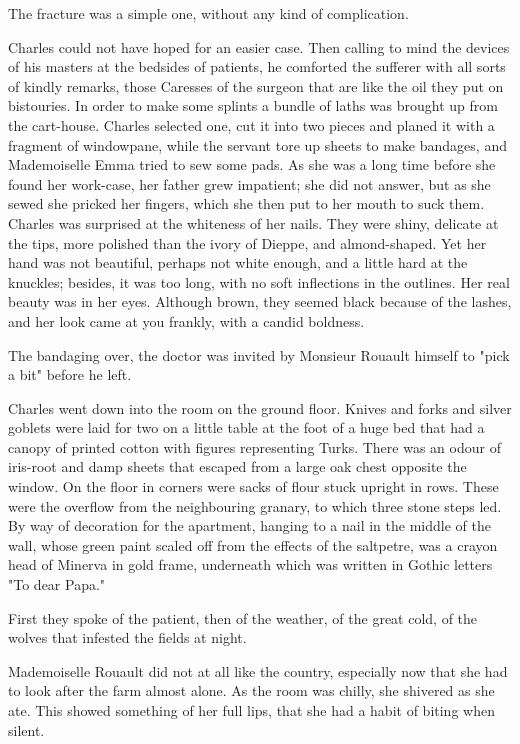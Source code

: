 \documentclass{tufte-book}
\begin{document}
The fracture was a simple one, without any kind of complication.

Charles could not have hoped for an easier case. Then calling to mind
the devices of his masters at the bedsides of patients, he comforted the
sufferer with all sorts of kindly remarks, those Caresses of the surgeon
that are like the oil they put on bistouries. In order to make some
splints a bundle of laths was brought up from the cart-house. Charles
selected one, cut it into two pieces and planed it with a fragment
of windowpane, while the servant tore up sheets to make bandages, and
Mademoiselle Emma tried to sew some pads. As she was a long time before
she found her work-case, her father grew impatient; she did not answer,
but as she sewed she pricked her fingers, which she then put to her
mouth to suck them. Charles was surprised at the whiteness of her nails.
They were shiny, delicate at the tips, more polished than the ivory of
Dieppe, and almond-shaped. Yet her hand was not beautiful, perhaps not
white enough, and a little hard at the knuckles; besides, it was too
long, with no soft inflections in the outlines. Her real beauty was in
her eyes. Although brown, they seemed black because of the lashes, and
her look came at you frankly, with a candid boldness.

The bandaging over, the doctor was invited by Monsieur Rouault himself
to "pick a bit" before he left.

Charles went down into the room on the ground floor. Knives and forks
and silver goblets were laid for two on a little table at the foot of a
huge bed that had a canopy of printed cotton with figures representing
Turks. There was an odour of iris-root and damp sheets that escaped
from a large oak chest opposite the window. On the floor in corners were
sacks of flour stuck upright in rows. These were the overflow from
the neighbouring granary, to which three stone steps led. By way of
decoration for the apartment, hanging to a nail in the middle of the
wall, whose green paint scaled off from the effects of the saltpetre,
was a crayon head of Minerva in gold frame, underneath which was written
in Gothic letters "To dear Papa."

First they spoke of the patient, then of the weather, of the great cold,
of the wolves that infested the fields at night.

Mademoiselle Rouault did not at all like the country, especially now
that she had to look after the farm almost alone. As the room was
chilly, she shivered as she ate. This showed something of her full lips,
that she had a habit of biting when silent.
\end{document}
